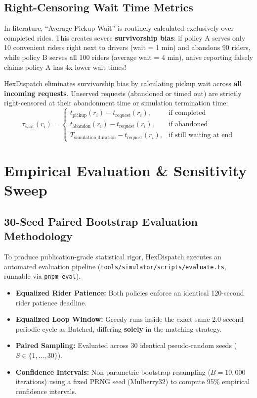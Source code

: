 \documentclass[11pt,a4paper]{article}
\begin{document}
\subsection{Right-Censoring Wait Time Metrics}
In literature, ``Average Pickup Wait'' is routinely calculated exclusively over completed rides. This creates severe \textbf{survivorship bias}: if policy A serves only 10 convenient riders right next to drivers (wait = 1 min) and abandons 90 riders, while policy B serves all 100 riders (average wait = 4 min), naive reporting falsely claims policy A has 4x lower wait times!

HexDispatch eliminates survivorship bias by calculating pickup wait across \textbf{all incoming requests}. Unserved requests (abandoned or timed out) are strictly right-censored at their abandonment time or simulation termination time:
\begin{equation}
    \tau_{\text{wait}}(r_i) = \begin{cases}
        t_{\text{pickup}}(r_i) - t_{\text{request}}(r_i), & \text{if completed} \\
        t_{\text{abandon}}(r_i) - t_{\text{request}}(r_i), & \text{if abandoned} \\
        T_{\text{simulation\_duration}} - t_{\text{request}}(r_i), & \text{if still waiting at end}
    \end{cases}
\end{equation}

\section{Empirical Evaluation \& Sensitivity Sweep}

\subsection{30-Seed Paired Bootstrap Evaluation Methodology}
To produce publication-grade statistical rigor, HexDispatch executes an automated evaluation pipeline (\texttt{tools/simulator/scripts/evaluate.ts}, runnable via \texttt{pnpm eval}).
\begin{itemize}[leftmargin=1.5em]
    \item \textbf{Equalized Rider Patience:} Both policies enforce an identical 120-second rider patience deadline.
    \item \textbf{Equalized Loop Window:} Greedy runs inside the exact same 2.0-second periodic cycle as Batched, differing \textbf{solely} in the matching strategy.
    \item \textbf{Paired Sampling:} Evaluated across 30 identical pseudo-random seeds ($S \in \{1, \dots, 30\}$).
    \item \textbf{Confidence Intervals:} Non-parametric bootstrap resampling ($B = 10,000$ iterations) using a fixed PRNG seed (Mulberry32) to compute 95\% empirical confidence intervals.
\end{itemize}
\end{document}
